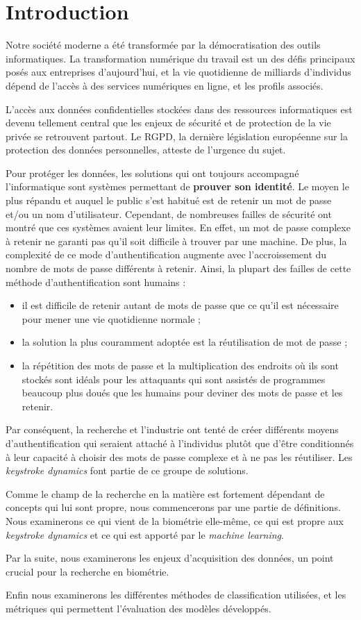 \section{Introduction}

Notre société moderne a été transformée par la démocratisation des outils informatiques. La transformation numérique du travail est un des défis principaux posés aux entreprises d'aujourd'hui, et la vie quotidienne de milliards d'individus dépend de l'accès à des services numériques en ligne, et les profils associés.

L'accès aux données confidentielles stockées dans des ressources informatiques est devenu tellement central que les enjeux de sécurité et de protection de la vie privée se retrouvent partout. Le RGPD, la dernière législation européenne sur la protection des données personnelles, atteste de l'urgence du sujet.

Pour protéger les données, les solutions qui ont toujours accompagné l'informatique sont systèmes permettant de \textbf{prouver son identité}. Le moyen le plus répandu et auquel le public s'est habitué est de retenir un mot de passe et/ou un nom d'utilisateur. Cependant, de nombreuses failles de sécurité ont montré que ces systèmes avaient leur limites. En effet, un mot de passe complexe à retenir ne garanti pas qu'il soit difficile à trouver par une machine. De plus, la complexité de ce mode d'authentification augmente avec l'accroissement du nombre de mots de passe différents à retenir. Ainsi, la plupart des failles de cette méthode d'authentification sont humains :

\begin{itemize}
	\item il est difficile de retenir autant de mots de passe que ce qu'il est nécessaire pour mener une vie quotidienne normale ;
	\item la solution la plus couramment adoptée est la réutilisation de mot de passe ;
	\item la répétition des mots de passe et la multiplication des endroits où ils sont stockés sont idéals pour les attaquants qui sont assistés de programmes beaucoup plus doués que les humains pour deviner des mots de passe et les retenir.
\end{itemize}

Par conséquent, la recherche et l'industrie ont tenté de créer différents moyens d'authentification qui seraient attaché à l'individus plutôt que d'être conditionnés à leur capacité à choisir des mots de passe complexe et à ne pas les réutiliser. Les \textit{keystroke dynamics} font partie de ce groupe de solutions.

Comme le champ de la recherche en la matière est fortement dépendant de concepts qui lui sont propre, nous commencerons par une partie de définitions. Nous examinerons ce qui vient de la biométrie elle-même, ce qui est propre aux \textit{keystroke dynamics} et ce qui est apporté par le \textit{machine learning}.

Par la suite, nous examinerons les enjeux d'acquisition des données, un point crucial pour la recherche en biométrie.

Enfin nous examinerons les différentes méthodes de classification utilisées, et les métriques qui permettent l'évaluation des modèles développés.
